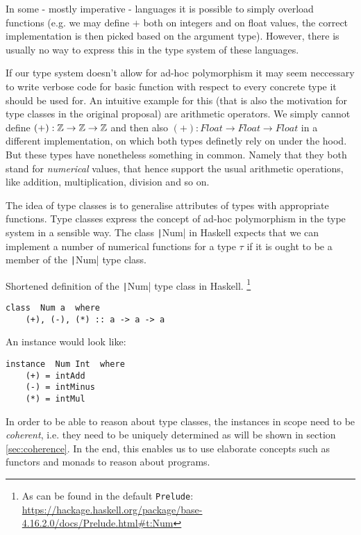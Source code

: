 In some - mostly imperative - languages it is possible to simply overload functions (e.g. we may define $+$ both on integers and on float values, the correct implementation is then picked based on the argument type).
However, there is usually no way to express this in the type system of these languages. %

If our type system doesn't allow for ad-hoc polymorphism it may seem neccessary to write verbose code for basic function with respect to every concrete type it should be used for.
An intuitive example for this (that is also the motivation for type classes in the original proposal) are arithmetic operators.
We simply cannot define $(+) : \mathbb{Z} \to \mathbb{Z} \to \mathbb{Z}$ and then also $(+) : \mathit{Float} \to \mathit{Float} \to \mathit{Float}$ in a different implementation, on which both types definetly rely on under the hood.
But these types have nonetheless something in common. Namely that they both stand for \emph{numerical} values, that hence support the usual arithmetic operations, like addition, multiplication, division and so on.

The idea of type classes is to generalise attributes of types with appropriate functions.
Type classes express the concept of ad-hoc polymorphism in the type system in a sensible  way.
The class \texttt|Num| in Haskell expects that we can implement a number of numerical functions for a type $\tau$ if it is ought to be a member of the \texttt|Num| type class.

Shortened definition of the \texttt|Num| type class in Haskell.
\footnote{As can be found in the default \texttt{Prelude}: \url{https://hackage.haskell.org/package/base-4.16.2.0/docs/Prelude.html\#t:Num}}

\begin{verbatim}
class  Num a  where
    (+), (-), (*) :: a -> a -> a
\end{verbatim}

An instance would look like:

\begin{verbatim}
instance  Num Int  where
    (+) = intAdd
    (-) = intMinus
    (*) = intMul
\end{verbatim}


In order to be able to reason about type classes, the instances in scope need to be \emph{coherent}, i.e. they need to be uniquely determined as will be shown in section \ref{sec:coherence}.
In the end, this enables us to use elaborate concepts such as functors and monads to reason about programs.

